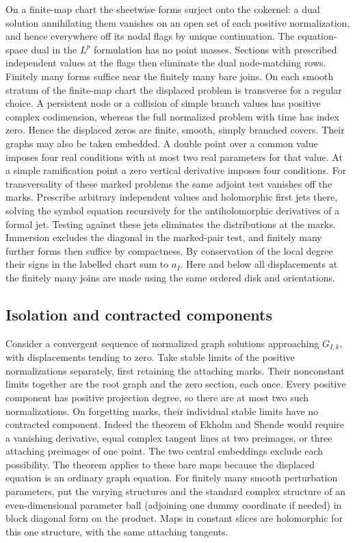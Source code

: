On a finite-map chart the sheetwise forms surject onto the cokernel:
a dual solution annihilating them vanishes on an open set of each
positive normalization, and hence everywhere off its nodal flags by
unique continuation. The equation-space dual in the $L^p$ formulation
has no point masses. Sections with prescribed independent values at
the flags then eliminate the dual node-matching rows. Finitely many
forms suffice near the finitely many bare joins. On each smooth
stratum of the finite-map chart the displaced problem is transverse
for a regular choice. A persistent node or a collision of simple
branch values has positive complex codimension, whereas the full
normalized problem with time has index zero. Hence the displaced
zeros are finite, smooth, simply branched covers. Their graphs may
also be taken embedded. A double point over a common value imposes
four real conditions with at most two real parameters for that value.
At a simple ramification point a zero vertical derivative imposes four
conditions. For transversality of these marked problems the same
adjoint test vanishes off the marks. Prescribe arbitrary independent
values and holomorphic first jets there, solving the symbol equation
recursively for the antiholomorphic derivatives of a formal jet.
Testing against these jets eliminates the distributions at the marks.
Immersion excludes the diagonal in the marked-pair test, and finitely
many further forms then suffice by compactness. By conservation of
the local degree their signs in the labelled chart sum to $a_I$.
Here and below all displacements at the finitely many joins are made
using the same ordered disk and orientations.

\subsection{Isolation and contracted components}
Consider a convergent sequence of normalized graph solutions
approaching $G_{I,k}$, with displacements tending to zero. Take stable
limits of the positive normalizations separately, first retaining the
attaching marks. Their nonconstant limits together are the root graph
and the zero section, each once. Every positive component has positive
projection degree, so there are at most two such normalizations.
On forgetting marks, their individual stable limits have no contracted
component. Indeed the theorem of Ekholm and Shende
\cite[Theorem~1.1]{ekholm} would require a vanishing derivative,
equal complex tangent lines at two preimages, or three attaching
preimages of one point. The two central embeddings exclude each
possibility. The theorem applies to these bare maps because the
displaced equation is an ordinary graph equation. For finitely many
smooth perturbation parameters, put the varying structures and the
standard complex structure of an even-dimensional parameter ball
(adjoining one dummy coordinate if needed) in block diagonal form
on the product. Maps in constant slices are holomorphic for this one
structure, with the same attaching tangents.

